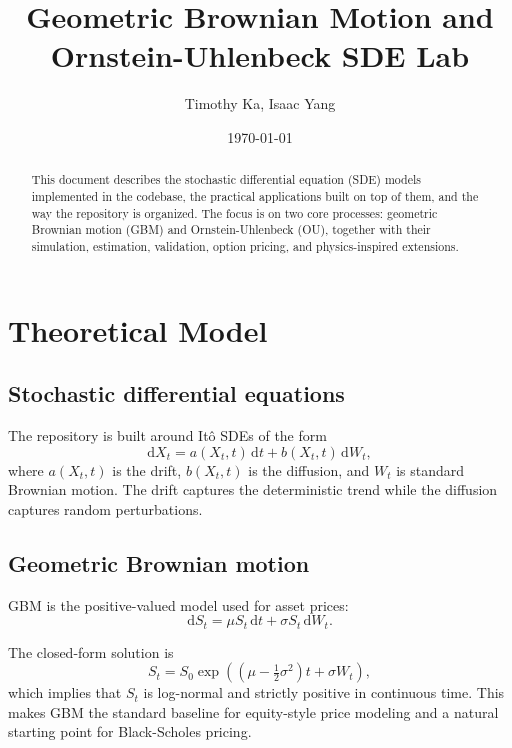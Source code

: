 \documentclass[11pt]{article}
\title{Geometric Brownian Motion and Ornstein-Uhlenbeck SDE Lab}
\author{Timothy Ka, Isaac Yang}
\date{\today}
\newcommand{\dd}{\mathrm{d}}
\begin{document}
\maketitle

\begin{abstract}
This document describes the stochastic differential equation (SDE) models implemented in the codebase, the practical applications built on top of them, and the way the repository is organized. The focus is on two core processes: geometric Brownian motion (GBM) and Ornstein-Uhlenbeck (OU), together with their simulation, estimation, validation, option pricing, and physics-inspired extensions.
\end{abstract}

\tableofcontents
\newpage

\section{Theoretical Model}

\subsection{Stochastic differential equations}

The repository is built around It\^o SDEs of the form
\begin{equation}
  \dd X_t = a(X_t,t)\,\dd t + b(X_t,t)\,\dd W_t,
\end{equation}
where $a(X_t,t)$ is the drift, $b(X_t,t)$ is the diffusion, and $W_t$ is standard Brownian motion. The drift captures the deterministic trend while the diffusion captures random perturbations.

\subsection{Geometric Brownian motion}

GBM is the positive-valued model used for asset prices:
\begin{equation}
  \dd S_t = \mu S_t\,\dd t + \sigma S_t\,\dd W_t.
\end{equation}

The closed-form solution is
\begin{equation}
  S_t = S_0 \exp\left(\left(\mu - \tfrac{1}{2}\sigma^2\right)t + \sigma W_t\right),
\end{equation}
which implies that $S_t$ is log-normal and strictly positive in continuous time. This makes GBM the standard baseline for equity-style price modeling and a natural starting point for Black-Scholes pricing.
\end{document}
